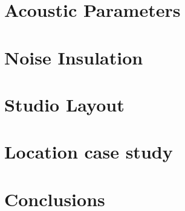 \documentclass[10pt, twocolumn]{article}
\begin{document}
    \section{Acoustic Parameters}

    \section{Noise Insulation}

    \section{Studio Layout}

    \section{Location case study}

    \section{Conclusions}

    
    
\end{document}
